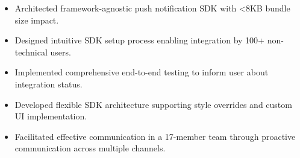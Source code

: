 \documentclass[a4paper,10pt]{article}
\newenvironment{achievementList}{
    \begin{itemize}[
        leftmargin=1em,
        itemindent=0mm,
        itemsep=2.5pt,
        topsep=0.2em,
        parsep=0mm,
    ]
    \sloppy
    \hyphenpenalty=1000
    \exhyphenpenalty=1000
    \setlength{\rightskip}{0mm plus 20em}
    \spaceskip=0.22em
}{
    \end{itemize}
}
\begin{document}
\begin{achievementList}

    \item Architected framework-agnostic push notification SDK with <8KB bundle size impact.
    \item Designed intuitive SDK setup process enabling integration by 100+ non-technical users.
    \item Implemented comprehensive end-to-end testing to inform user about integration status.
    \item Developed flexible SDK architecture supporting style overrides and custom UI implementation.


    \item Facilitated effective communication in a 17-member team through proactive communication across multiple channels.



\end{achievementList}
\end{document}

